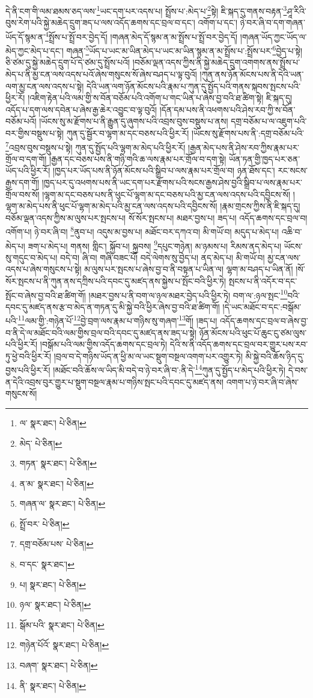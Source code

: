 དེ་ནི་ངག་གི་ལམ་ཐམས་ཅད་ལས་\footnote{ལ་  སྣར་ཐང་།  པེ་ཅིན། }ཡང་དག་པར་འདས་པ། སྤྲོས་པ་:མེད་པ་\footnote{མེད་  པེ་ཅིན། }སྟེ། ཇི་སྐད་དུ་གནས་བརྟན་\footnote{གཏན་  སྣར་ཐང་།  པེ་ཅིན། }ཤཱ་རིའི་བུས་རེག་པའི་སྐྱེ་མཆེད་དྲུག་ཟད་པ་ལས་འདོད་ཆགས་དང་བྲལ་བ་དང་། འགོག་པ་དང་། ཉེ་བར་ཞི་བ་དག་གཞན་ཡོད་དོ་སྙམ་ན་\footnote{ན་མ་  སྣར་ཐང་།  པེ་ཅིན། }སྤྲོས་པ་སྤྲོ་བར་བྱེད་དོ། །གཞན་མེད་དོ་སྙམ་ན་མ་སྤྲོས་པ་སྤྲོ་བར་བྱེད་དོ། །གཞན་ཡོད་ཀྱང་ཡོད་ལ་མེད་ཀྱང་མེད་པ་དང་། གཞན་\footnote{གཞན་ལ་  སྣར་ཐང་།  པེ་ཅིན། }ཡོད་པ་ཡང་མ་ཡིན་མེད་པ་ཡང་མ་ཡིན་སྙམ་ན་མ་སྤྲོས་པ་:སྤྲོས་པར་\footnote{སྤྲོ་བར་  པེ་ཅིན། }བྱེད་པ་སྟེ། ཅི་ཙམ་དུ་སྐྱེ་མཆེད་དྲུག་པོ་དེ་ཙམ་དུ་སྤྲོས་པའོ། །བཅོམ་ལྡན་འདས་ཀྱིས་ནི་སྐྱེ་མཆེད་དྲུག་འགགས་ནས་སྤྲོས་པ་མེད་པ་ནི་མྱ་ངན་ལས་འདས་པའོ་ཞེས་གསུངས་སོ་ཞེས་བཤད་པ་ལྟ་བུའོ། །ཀུན་ནས་ཉོན་མོངས་པས་ནི་དེའི་ཡན་ལག་མྱ་ངན་ལས་འདས་པ་སྟེ། དེའི་ཡན་ལག་ཉོན་མོངས་པའི་རྣམ་པ་ཀུན་དུ་སྤྱོད་པའི་གནས་སྐབས་སྤངས་པའི་ཕྱིར་རོ། །འཇིག་རྟེན་པའི་ལམ་གྱི་ས་བོན་བཅོམ་པའི་འགོག་པ་གང་ཡིན་པ་ཞེས་བྱ་བའི་ཐ་ཚིག་སྟེ། ཇི་སྐད་དུ། འདོད་པ་དག་ལས་དབེན་པ་ཞེས་རྒྱ་ཆེར་འབྱུང་བ་ལྟ་བུའོ། །དོན་དམ་པས་ནི་འཕགས་པའི་ཤེས་རབ་ཀྱི་ས་བོན་བཅོམ་པའོ། །ཡོངས་སུ་མ་རྫོགས་པ་ནི་རྒྱུན་དུ་ཞུགས་པའི་འབྲས་བུས་བསྡུས་པ་ནས། དགྲ་བཅོམ་པ་ལ་འཇུག་པའི་བར་གྱིས་བསྡུས་པ་སྟེ། ཀུན་དུ་སྦྱོར་བ་ལྷག་མ་དང་བཅས་པའི་ཕྱིར་རོ། །ཡོངས་སུ་རྫོགས་པས་ནི་:དགྲ་བཅོམ་པའི་\footnote{དགྲ་བཅོམ་པས་  པེ་ཅིན། }འབྲས་བུས་བསྡུས་པ་སྟེ། ཀུན་དུ་སྤྱོད་པའི་ལྷག་མ་མེད་པའི་ཕྱིར་རོ། །རྒྱན་མེད་པས་ནི་ཤེས་རབ་ཀྱིས་རྣམ་པར་གྲོལ་བ་དག་གོ། །རྒྱན་དང་བཅས་པས་ནི་གཉི་གའི་ཆ་ལས་རྣམ་པར་གྲོལ་བ་དག་སྟེ། ཡོན་ཏན་གྱི་ཁྱད་པར་ཅན་ཡོད་པའི་ཕྱིར་རོ། །ཁྱད་པར་ཡོད་པས་ནི་ཉོན་མོངས་པའི་སྒྲིབ་པ་ལས་རྣམ་པར་གྲོལ་བ། ཉན་ཐོས་དང་། རང་སངས་རྒྱས་དག་གོ། །ཁྱད་པར་དུ་འཕགས་པས་ནི་ཡང་དག་པར་རྫོགས་པའི་སངས་རྒྱས་ཤེས་བྱའི་སྒྲིབ་པ་ལས་རྣམ་པར་གྲོལ་བས་སོ། །ལྷག་མ་དང་བཅས་པས་ནི་ཕུང་པོ་ལྷག་མ་དང་བཅས་པའི་མྱ་ངན་ལས་འདས་པའི་དབྱིངས་སོ། །ལྷག་མ་མེད་པས་ནི་ཕུང་པོ་ལྷག་མ་མེད་པའི་མྱ་ངན་ལས་འདས་པའི་དབྱིངས་སོ། །རྣམ་གྲངས་ཀྱིས་ནི་ཇི་སྐད་དུ། བཅོམ་ལྡན་འདས་ཀྱིས་མ་ལུས་པར་སྤངས་པ། སོ་སོར་སྤངས་པ། མཐར་བྱས་པ། ཟད་པ། འདོད་ཆགས་དང་བྲལ་བ། འགོག་པ། ཉེ་བར་ཞི་བ། \footnote{བ་དང་  སྣར་ཐང་། }ནུབ་པ། འདུས་མ་བྱས་པ། མཐོང་བར་དཀའ་བ། མི་གཡོ་བ། མདུད་པ་མེད་པ། འཆི་བ་མེད་པ། ཟག་པ་མེད་པ། གནས། གླིང་། སྐྱོབ་པ། སྐྱབས། \footnote{པ།    སྣར་ཐང་།  པེ་ཅིན། }དཔུང་གཉེན། མ་ཉམས་པ། རིམས་ནད་མེད་པ། ཡོངས་སུ་གདུང་བ་མེད་པ། བདེ་བ། ཞི་བ། གཞི་བཟང་པོ། བདེ་ལེགས་སུ་བྱེད་པ། ནད་མེད་པ། མི་གཡོ་བ། མྱ་ངན་ལས་འདས་པ་ཞེས་གསུངས་པ་སྟེ། མ་ལུས་པར་སྤངས་པ་ཞེས་བྱ་བ་ནི་བསྟན་པ་ཡིན་ལ། ལྷག་མ་བཤད་པ་ཡིན་ནོ། །སོ་སོར་སྤངས་པ་ནི་ཀུན་ནས་དཀྲིས་པའི་དབང་དུ་མཛད་ནས་སྐྱེས་པ་སྤོང་བའི་ཕྱིར་ཏེ། སྤངས་པ་ནི་འདོར་བ་དང་སྤོང་བ་ཞེས་བྱ་བའི་ཐ་ཚིག་གོ། །མཐར་བྱས་པ་ནི་བག་ལ་ཉལ་མཐར་བྱེད་པའི་ཕྱིར་ཏེ། བག་ལ་:ཉལ་སྤང་\footnote{ཉལ་  སྣར་ཐང་།  པེ་ཅིན། }བའི་དབང་དུ་མཛད་ནས་རྩ་བ་མེད་ན་གཏན་དུ་མི་སྐྱེ་བའི་ཕྱིར་ཞེས་བྱ་བའི་ཐ་ཚིག་གོ། །དེ་ཡང་མཐོང་བ་དང་:བསྒོམ་པའི་\footnote{སྒོམ་པའི་  སྣར་ཐང་།  པེ་ཅིན། }ལམ་གྱི་:གཉེན་པོ་\footnote{གཉེན་པོའོ་  སྣར་ཐང་།  པེ་ཅིན། }བྱེ་བྲག་ལས་རྣམ་པ་གཉིས་སུ་གཞག་\footnote{བཞག་  སྣར་ཐང་།  པེ་ཅིན། }གོ། །ཟད་པ། འདོད་ཆགས་དང་བྲལ་བ་ཞེས་བྱ་བ་ནི་དེ་ལ་མཐོང་བའི་ལམ་གྱིས་བྲལ་བའི་དབང་དུ་མཛད་ནས་ཟད་པ་སྟེ། ཉོན་མོངས་པའི་ཕུང་པོ་ཆུང་ངུ་ཙམ་ལུས་པའི་ཕྱིར་རོ། །བསྒོམ་པའི་ལམ་གྱིས་འདོད་ཆགས་དང་བྲལ་ཏེ། དེའི་ས་ནི་འདོད་ཆགས་དང་བྲལ་བར་གྱུར་པས་རབ་ཏུ་ཕྱེ་བའི་ཕྱིར་རོ། །བྲལ་བ་དེ་གཉིས་ཡོད་ན་ཕྱི་མ་ལ་ཡང་སྡུག་བསྔལ་འགག་པར་འགྱུར་ཏེ། མི་སྐྱེ་བའི་ཆོས་ཉིད་དུ་བྱས་པའི་ཕྱིར་རོ། །མཐོང་བའི་ཆོས་ལ་ཡིད་མི་བདེ་བ་ཉེ་བར་ཞི་བ་:ནི་དེ་\footnote{ནི་  སྣར་ཐང་།  པེ་ཅིན། }ཀུན་དུ་སྤྱོད་པ་མེད་པའི་ཕྱིར་ཏེ། དེ་བས་ན་དེའི་འབྲས་བུར་གྱུར་པ་སྡུག་བསྔལ་རྣམ་པ་གཉིས་སྤང་པའི་དབང་དུ་མཛད་ནས། འགག་པ་ཉེ་བར་ཞི་བ་ཞེས་གསུངས་སོ། 